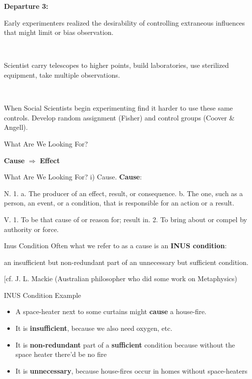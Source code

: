 \documentclass{beamer}
\begin{document}
\begin{frame}
\textbf{Departure 3:}

Early experimenters realized the desirability of controlling
extraneous influences that might limit or bias observation.

\pause

\

Scientist carry telescopes to higher points, build laboratories, use sterilized equipment, take multiple observations.

\

When Social Scientists begin experimenting find it harder to use these same controls. Develop random assignment (Fisher) and control groups (Coover \& Angell).
\end{frame}

\begin{frame}

\begin{center}
 \LARGE  What Are We Looking For?  \pause

 \textbf{Cause} $\Rightarrow$   \textbf{Effect}
\end{center}
\end{frame}

\begin{frame}{What Are We Looking For?  i) Cause.}
\textbf{Cause}:

N. 1. a. The producer of an effect, result, or
consequence. b. The one, such as a person, an event, or a condition, that is
responsible for an action or a result.

V. 1. To be that cause of or reason
for; result in.
2. To bring about or compel by authority or force.
\end{frame}

\begin{frame}{Inus Condition}
Often what we refer to as a cause is an \textbf{INUS condition}:

an insufficient but non-redundant part of an unnecessary
but sufficient condition.

[cf.  J. L. Mackie (Australian philosopher who did some work on Metaphysics)
\end{frame}

\begin{frame}{INUS Condition Example}
\begin{itemize}
	\item A space-heater next to some curtains might \textbf{cause} a house-fire. \pause
	\item It is \textbf{insufficient}, because we also need oxygen, etc. \pause
	\item It is \textbf{non-redundant} part of a \textbf{sufficient} condition because without the space heater there'd be no fire \pause
	\item It is \textbf{unnecessary}, because house-fires occur in homes without space-heaters
\end{itemize}
\end{frame}
\end{document}
